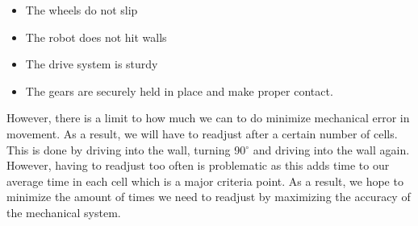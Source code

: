 \documentclass[11pt]{article}
\begin{document}
\begin{itemize}
\item The wheels do not slip
\item The robot does not hit walls
\item The drive system is sturdy 
\item The gears are securely held in place and make proper contact. 
\end{itemize}
However, there is a limit to how much we can to do minimize mechanical error in movement. As a result, we will have to readjust after a certain number of cells. This is done by driving into the wall, turning 90$^{\circ}$ and driving into the wall again. However, having to readjust too often is problematic as this adds time to our average time in each cell which is a major criteria point. As a result, we hope to minimize the amount of times we need to readjust by maximizing the accuracy of the mechanical system. 

\newpage
\end{document}
